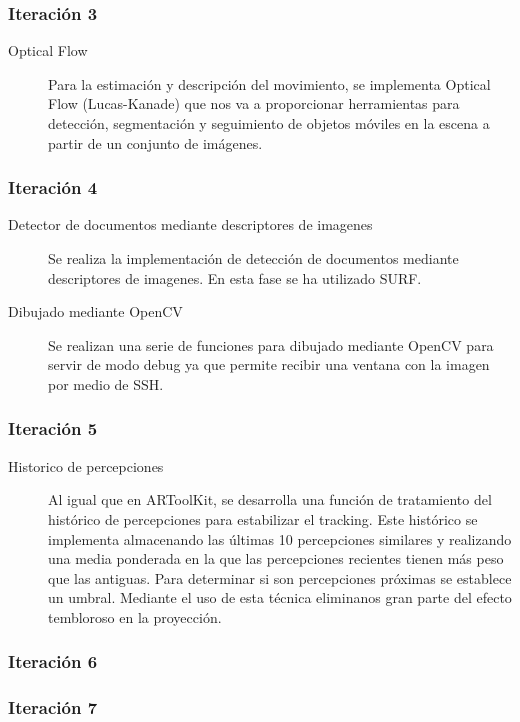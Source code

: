 \subsubsection{Iteración 3}
\begin{description}
\item [Optical Flow] Para la estimación y descripción del movimiento, se implementa Optical Flow  (Lucas-Kanade) que nos va a proporcionar herramientas para detección, segmentación y seguimiento de  objetos móviles en la escena a partir de un conjunto de imágenes. 

\end{description}
\subsubsection{Iteración 4}
\begin{description}
\item [Detector de documentos mediante descriptores de imagenes] Se realiza la implementación de detección de documentos mediante descriptores de imagenes. En esta fase se ha utilizado SURF.
\item [Dibujado mediante OpenCV] Se realizan una serie de funciones para dibujado mediante OpenCV para servir de modo debug ya que permite recibir una ventana con la imagen por medio de SSH.
\end{description}

\subsubsection{Iteración 5}
\begin{description}
\item [Historico de percepciones] Al igual que en ARToolKit, se desarrolla una función de tratamiento del histórico de percepciones para estabilizar el tracking. Este histórico se implementa  almacenando las últimas 10 percepciones similares y realizando una media ponderada en la que las percepciones recientes tienen más peso que las antiguas. Para determinar si son percepciones próximas se establece un umbral. Mediante el uso de esta técnica eliminanos gran parte del efecto tembloroso en la proyección.
\end{description}

\subsubsection{Iteración 6}
\subsubsection{Iteración 7}

